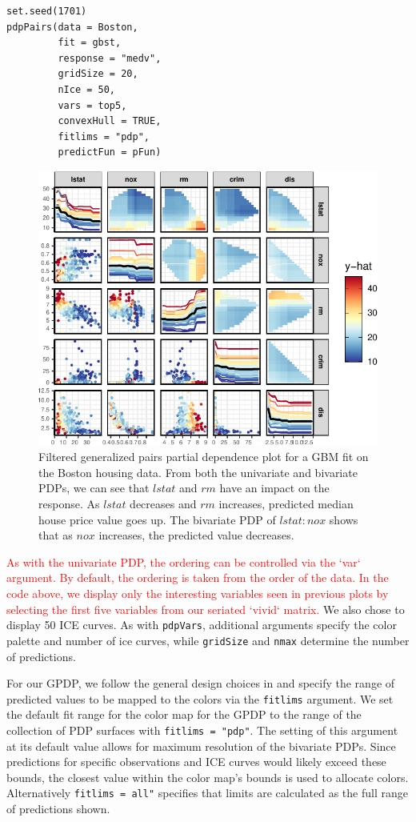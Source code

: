 \begin{verbatim}
set.seed(1701)
pdpPairs(data = Boston,
         fit = gbst,
         response = "medv",
         gridSize = 20,
         nIce = 50,
         vars = top5,
         convexHull = TRUE,
         fitlims = "pdp",
         predictFun = pFun)
\end{verbatim}

\begin{figure}

{\centering \includegraphics[width=0.75\linewidth]{vivid_files/figure-latex/gpdp-1} 

}

\caption{Filtered generalized pairs partial dependence plot for a GBM fit on the Boston housing data. From both the univariate and bivariate PDPs, we can see that $lstat$ and $rm$ have an impact on the response. As $lstat$ decreases and $rm$ increases, predicted median house price value goes up. The bivariate PDP of $lstat:nox$ shows that as $nox$ increases, the predicted value decreases.}\label{fig:gpdp}
\end{figure}

\textcolor{red}{As with the univariate PDP, the ordering can be controlled via the `var` argument. By default, the ordering is taken from the order of the data.  In the code above, we display only the interesting variables seen in previous plots by selecting the first five variables from our seriated `vivid` matrix.} We also chose to display 50 ICE curves. As with \texttt{pdpVars}, additional arguments specify the color palette and number of ice curves, while \texttt{gridSize} and \texttt{nmax} determine the number of predictions.

For our GPDP, we follow the general design choices in  and specify the range of predicted values to be mapped to the colors via the \texttt{fitlims} argument. We set the default fit range for the color map for the GPDP to the range of the collection of PDP surfaces with \texttt{fitlims\ =\ "pdp"}. The setting of this argument at its default value allows for maximum resolution of the bivariate PDPs. Since predictions for specific observations and ICE curves would likely exceed these bounds, the closest value within the color map's bounds is used to allocate colors. Alternatively \texttt{fitlims\ =\ \textquotesingle{}all"} specifies that limits are calculated as the full range of predictions shown.

